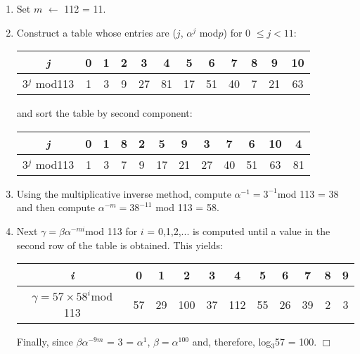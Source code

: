 \documentclass[iwp,first]{luthesis}
\begin{document}
\begin{enumerate}
\item Set $m$ $\leftarrow$ 112 = 11.
\item Construct a table whose entries are ($j$, $\alpha^j$ mod$p$) for 0 $\leq j < 11$: 
\begin{table}[ht]
\centering
\begin{tabular}{|c||c|c|c|c|c|c|c|c|c|c|c|}
\hline
\textit{j} & 0 & 1 & 2 & 3 & 4 & 5 & 6 & 7 & 8 & 9 & 10 \\ [0.5ex]
\hline
3$^j$ mod113 & 1 & 3 & 9 & 27 & 81 & 17 & 51 & 40 & 7 & 21 & 63 \\ [1ex]
\hline
\end{tabular}
\label{table:nonlin}
\end{table} 

and sort the table by second component:

\begin{table}[ht]
\centering
\begin{tabular}{|c||c|c|c|c|c|c|c|c|c|c|c|}
\hline
\textit{j} & 0 & 1 & 8 & 2 & 5 & 9 & 3 & 7 & 6 & 10 & 4 \\ [0.5ex]
\hline
3$^j$ mod113 & 1 & 3 & 7 & 9 & 17 & 21 & 27 & 40 & 51 & 63 & 81 \\ [1ex]
\hline
\end{tabular}
\label{table:nonlin}
\end{table} 

\item Using the multiplicative inverse method, compute $\alpha^{-1} = 3^{-1}$mod 113 = 38 and then compute $\alpha^{-m} = 38^{-11}$ mod 113 = 58.
\item Next $\gamma = \beta\alpha^{-mi}$mod 113 for $i$ = 0,1,2,... is computed until a value in the second row of the table is obtained. This yields:

\begin{table}[ht]
\centering
\begin{tabular}{|c||c|c|c|c|c|c|c|c|c|c|}
\hline
\textit{i} & 0 & 1 & 2 & 3 & 4 & 5 & 6 & 7 & 8 & 9 \\ [0.5ex]
\hline
$\gamma = 57 \times 58^{i}$mod 113 & 57 & 29 & 100 & 37 & 112 & 55 & 26 & 39 & 2 & 3 \\ [1ex]
\hline
\end{tabular}
\label{table:nonlin}
\end{table} 

Finally, since $\beta\alpha^{-9m}$ = 3 = $\alpha^1$, $\beta = \alpha^{100}$ and, therefore, log$_{3}$57 = 100.
\hfill $\Box$
\end{enumerate}
\end{document}
